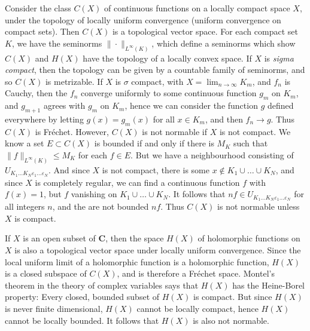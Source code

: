 \begin{example}
    Consider the class $C(X)$ of continuous functions on a locally compact space $X$, under the topology of locally uniform convergence (uniform convergence on compact sets). Then $C(X)$ is a topological vector space. For each compact set $K$, we have the seminorms $\| \cdot \|_{L^\infty(K)}$, which define a seminorms which show $C(X)$ and $H(X)$ have the topology of a locally convex space. If $X$ is {\it sigma compact}, then the topology can be given by a countable family of seminorms, and so $C(X)$ is metrizable. If $X$ is $\sigma$ compact, with $X = \lim_{n \to \infty} K_m$, and $f_n$ is Cauchy, then the $f_n$ converge uniformly to some continuous function $g_m$ on $K_m$, and $g_{m+1}$ agrees with $g_m$ on $K_m$, hence we can consider the function $g$ defined everywhere by letting $g(x) = g_m(x)$ for all $x \in K_m$, and then $f_n \to g$. Thus $C(X)$ is Fr\'{e}chet. However, $C(X)$ is not normable if $X$ is not compact. We know a set $E \subset C(X)$ is bounded if and only if there is $M_K$ such that $\| f \|_{L^\infty(K)} \leq M_K$ for each $f \in E$. But we have a neighbourhood consisting of $U_{K_1 \dots K_N \varepsilon_1 \dots \varepsilon_N}$. And since $X$ is not compact, there is some $x \not \in K_1 \cup \dots \cup K_N$, and since $X$ is completely regular, we can find a continuous function $f$ with $f(x) = 1$, but $f$ vanishing on $K_1 \cup \dots \cup K_N$. It follows that $nf \in U_{K_1 \dots K_N \varepsilon_1 \dots \varepsilon_N}$ for all integers $n$, and the are not bounded $nf$. Thus $C(X)$ is not normable unless $X$ is compact.
\end{example}

\begin{example}
    If $X$ is an open subset of $\mathbf{C}$, then the space $H(X)$ of holomorphic functions on $X$ is also a topological vector space under locally uniform convergence. Since the local uniform limit of a holomorphic function is a holomorphic function, $H(X)$ is a closed subspace of $C(X)$, and is therefore a Fr\'{e}chet space. Montel's theorem in the theory of complex variables says that $H(X)$ has the Heine-Borel property: Every closed, bounded subset of $H(X)$ is compact. But since $H(X)$ is never finite dimensional, $H(X)$ cannot be locally compact, hence $H(X)$ cannot be locally bounded. It follows that $H(X)$ is also not normable.
\end{example}

